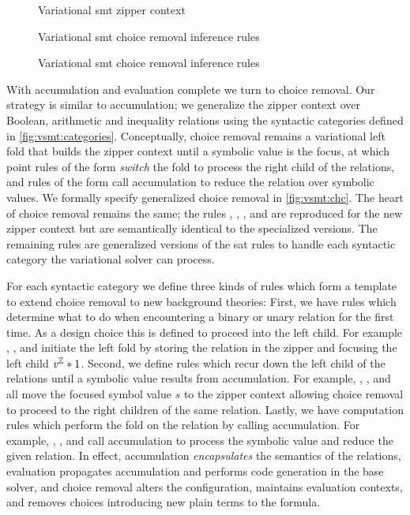 \label{section:vsmt:choice-removal}
%
\begin{figure}
  
  \caption{Variational \ac{smt} zipper context}
  \label{fig:vsmt:zipper}
\end{figure}
%
\begin{figure}
  
  \caption{Variational \ac{smt} choice removal inference rules}%
  \label{fig:vsmt:chc}
\end{figure}
%
\begin{figure}
  \ContinuedFloat
  
  \caption{Variational \ac{smt} choice removal inference rules}
  \label{fig:vsmt:chc-cont}
\end{figure}
%
With accumulation and evaluation complete we turn to choice removal.
%
Our strategy is similar to accumulation; we generalize the zipper context over
Boolean, arithmetic and inequality relations using the syntactic categories
defined in \autoref{fig:vsmt:categories}.
%
Conceptually, choice removal remains a variational left fold that builds the
zipper context until a symbolic value is the focus, at which point rules of the
form  \emph{switch} the fold to process the right child of the
relations, and rules of the form  call accumulation to reduce the
relation over symbolic values. We formally specify generalized choice removal in
\autoref{fig:vsmt:chc}. The heart of choice removal remains the same; the rules
\crEval{}, \crChc{}, \crChcT{}, and \crChcF{} are reproduced for the new zipper
context \zipper{} but are semantically identical to the specialized versions. The
remaining rules are generalized versions of the \ac{sat} rules to handle each
syntactic category the variational solver can process.

For each syntactic category we define three kinds of rules which form a template
to extend choice removal to new background theories: First, we have rules which
determine what to do when encountering a binary or unary relation for the first
time. As a design choice this is defined to proceed into the left child. For
example \crNot{}, \crBool{}, and \crInEq{} initiate the left fold by storing the
relation in the zipper and focusing the left child $\mathit{v^{\mathbb{Z}}}*{1}$.
%
Second, we define rules which recur down the left child of the relations until a
symbolic value results from accumulation. For example, \crInEqL{}, \crBoolL{},
and \crArithL{} all move the focused symbol value $s$ to the zipper context
allowing choice removal to proceed to the right children of the same relation.
%
Lastly, we have computation rules which perform the fold on the relation by
calling accumulation. For example, \crUnaryIn{}, \crArithR{}, and \crInEqR{}
call accumulation to process the symbolic value and reduce the given relation.
In effect, accumulation \emph{encapsulates} the semantics of the relations,
evaluation propagates accumulation and performs code generation in the base
solver, and choice removal alters the configuration, maintains evaluation
contexts, and removes choices introducing new plain terms to the formula.

